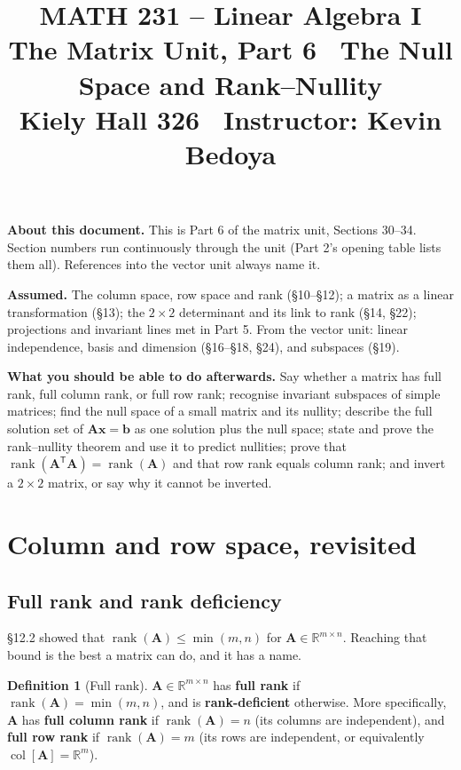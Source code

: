 \documentclass[11pt]{article}
\title{\vspace{-1.2cm}\textbf{\sffamily MATH 231 -- Linear Algebra I}\\[4pt]
       {\large\sffamily The Matrix Unit, Part 6 \textbullet\ The Null Space
        and Rank--Nullity}\\[2pt]
       {\normalsize\sffamily Kiely Hall 326 \textbullet\
        Instructor: Kevin Bedoya}}
\author{}
\date{}
\theoremstyle{plain}
\theoremstyle{definition}
\newtheorem{defn}{Definition}[section]
\theoremstyle{remark}
\newcommand{\R}{\mathbb{R}}
\newcommand{\vc}[1]{\mathbf{#1}}
\newcommand{\mt}[1]{\mathbf{#1}}
\newcommand{\T}{^{\mathsf{T}}}
\newcommand{\colsp}[1]{\operatorname{col}[#1]}
\DeclareMathOperator{\rank}{rank}
\begin{document}
\setcounter{section}{29}  %
\maketitle
\vspace{-1.6cm}

\noindent\textbf{About this document.} This is Part 6 of the matrix unit,
Sections 30--34. Section numbers run continuously through the unit (Part 2's
opening table lists them all). References into the vector unit always name it.

\medskip
\noindent\textbf{Assumed.} The column space, row space and rank (\S10--\S12);
a matrix as a linear transformation (\S13); the $2\times2$ determinant and its
link to rank (\S14, \S22); projections and invariant lines met in Part 5. From
the vector unit: linear independence, basis and dimension (\S16--\S18, \S24),
and subspaces (\S19).

\medskip
\noindent\textbf{What you should be able to do afterwards.} Say whether a
matrix has full rank, full column rank, or full row rank; recognise invariant
subspaces of simple matrices; find the null space of a small matrix and its
nullity; describe the full solution set of $\mt{A}\vc{x}=\vc{b}$ as one solution
plus the null space; state and prove the rank--nullity theorem and use it to
predict nullities; prove that $\rank(\mt{A}\T\mt{A})=\rank(\mt{A})$ and that row
rank equals column rank; and invert a $2\times2$ matrix, or say why it cannot be
inverted.

\section{Column and row space, revisited}

\subsection{Full rank and rank deficiency}
\S12.2 showed that $\rank(\mt{A})\le\min(m,n)$ for $\mt{A}\in\R^{m\times n}$.
Reaching that bound is the best a matrix can do, and it has a name.

\begin{defn}[Full rank]
$\mt{A}\in\R^{m\times n}$ has \textbf{full rank} if $\rank(\mt{A})=\min(m,n)$,
and is \textbf{rank-deficient} otherwise. More specifically, $\mt{A}$ has
\textbf{full column rank} if $\rank(\mt{A})=n$ (its columns are independent),
and \textbf{full row rank} if $\rank(\mt{A})=m$ (its rows are independent, or
equivalently $\colsp{\mt{A}}=\R^{m}$).
\end{defn}
\end{document}
